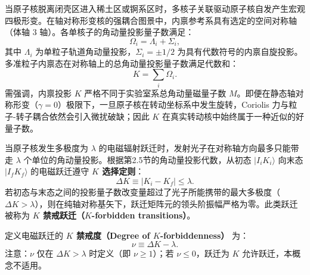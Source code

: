 当原子核脱离闭壳区进入稀土区或锕系区时，多核子关联驱动原子核自发产生宏观四极形变。在轴对称形变核的强耦合图景中，内禀参考系具有选定的空间对称轴（体轴 $3$ 轴）。各单核子的角动量投影量子数满足：
\begin{equation}\label{eq:4-6-omega-i-def}
\Omega_i = \Lambda_i + \Sigma_i,
\end{equation}
其中 $\Lambda_i$ 为单粒子轨道角动量投影，$\Sigma_i = \pm 1/2$ 为具有代数符号的内禀自旋投影。多准粒子内禀态在对称轴上的总角动量投影量子数满足代数和：
\begin{equation}\label{eq:4-6-K-def}
K = \sum_i \Omega_i.
\end{equation}
需强调，内禀投影 $K$ 严格不同于实验室系总角动量磁量子数 $M$。即便在静态轴对称形变（$\gamma = 0$）极限下，一旦原子核在转动坐标系中发生旋转，Coriolis 力与粒子-转子耦合依然会引入微扰破缺；因此 $K$ 在真实转动核中始终属于一种近似的好量子数。

当原子核发生多极度为 $\lambda$ 的电磁辐射跃迁时，发射光子在对称轴方向最多只能带走 $\lambda$ 个单位的角动量投影。根据第2.5节的角动量投影代数，从初态 $|I_i K_i\rangle$ 向末态 $|I_f K_f\rangle$ 的电磁跃迁遵守 \textbf{$K$ 选择定则}：
\begin{equation}\label{eq:4-6-K-selection-rule}
\Delta K \equiv |K_i - K_f| \le \lambda.
\end{equation}
若初态与末态之间的投影量子数改变量超过了光子所能携带的最大多极度（$\Delta K > \lambda$），则在纯轴对称基矢下，跃迁矩阵元的领头阶振幅严格为零。此类跃迁被称为 \textbf{$K$ 禁戒跃迁（$K$-forbidden transitions）}。

定义电磁跃迁的 \textbf{$K$ 禁戒度（Degree of $K$-forbiddenness）} 为：
\begin{equation}\label{eq:4-6-forbiddenness-degree}
\nu \equiv \Delta K - \lambda.
\end{equation}
注意：$\nu$ 仅在 $\Delta K > \lambda$ 时定义（即 $\nu \ge 1$）；若 $\nu \le 0$，跃迁为 $K$ 允许跃迁，本概念不适用。

